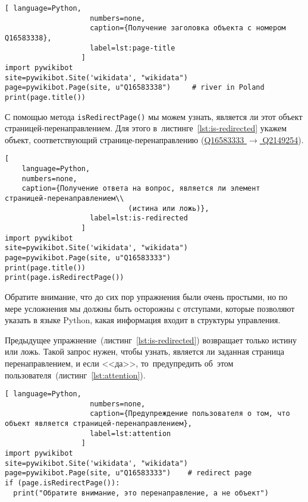 \begin{lstlisting}[ language=Python,
                    numbers=none,
                    caption={Получение заголовка объекта с номером Q16583338},
                    label=lst:page-title
                  ]
import pywikibot
site=pywikibot.Site('wikidata', "wikidata")
page=pywikibot.Page(site, u"Q16583338")     # river in Poland
print(page.title())
\end{lstlisting}

С помощью метода \lstinline|isRedirectPage()| 
мы можем узнать, является ли этот объект страницей-перенаправлением. 
Для этого в~листинге~\ref{lst:is-redirected} 
укажем объект, соответствующий странице-перена\-пра\-вле\-нию 
(\href{https://www.wikidata.org/w/index.php?title=Q16583333&redirect=no}
      {Q16583333 $\rightarrow$ Q2149254}). 



\begin{lstlisting}[ 
    language=Python,
    numbers=none,
    caption={Получение ответа на вопрос, является ли элемент страницей-перенаправлением\\
                             (истина или ложь)},
                    label=lst:is-redirected
                  ]
import pywikibot
site=pywikibot.Site('wikidata', "wikidata")
page=pywikibot.Page(site, u"Q16583333")
print(page.title())
print(page.isRedirectPage())
\end{lstlisting}

Обратите внимание, что до сих пор упражнения были очень простыми, но по мере усложнения мы должны быть осторожны с отступами, которые позволяют указать в языке Python, какая информация входит в структуры управления.

Предыдущее упражнение~(листинг~\ref{lst:is-redirected}) возвращает только истину или ложь. 
Такой запрос нужен, чтобы узнать, является ли заданная страница перенаправлением, 
и если <<да>>, 
то~предупредить об~этом пользователя~(листинг~\ref{lst:attention}).



\newpage
\begin{lstlisting}[ language=Python,
                    numbers=none,
                    caption={Предупреждение пользователя о том, что объект является страницей-перенаправлением},
                    label=lst:attention
                  ]
import pywikibot
site=pywikibot.Site('wikidata', "wikidata")
page=pywikibot.Page(site, u"Q16583333")    # redirect page
if (page.isRedirectPage()):
  print("Обратите внимание, это перенаправление, а не объект")
\end{lstlisting}

